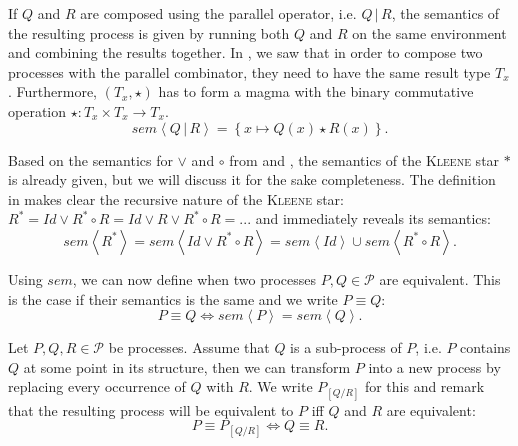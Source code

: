 If $Q$ and $R$ are composed using the parallel operator, i.e. $Q \,|\, R$, the semantics of the resulting process is given by running both $Q$ and $R$ on the same environment and combining the results together. In , we saw that in order to compose two processes with the parallel combinator, they need to have the same result type $T_x$. Furthermore, $\left( T_x, \star \right)$ has to form a magma with the binary commutative operation $\star \colon T_x \times T_x \to T_x$.
\begin{equation}
  \label{eqn:sem_parallel}
  sem \left\langle Q \,|\, R \right\rangle = \left\{ x \mapsto Q \left( x \right) \star R \left( x \right) \right\}.
\end{equation}

Based on the semantics for $\vee$ and $\circ$ from  and , the semantics of the \textsc{Kleene} star $*$ is already given, but we will discuss it for the sake completeness. The definition in  makes clear the recursive nature of the \textsc{Kleene} star: $R^* = Id \vee R^* \circ R = Id \vee R \vee R^* \circ R =  ...$ and immediately reveals its semantics:
\begin{equation}
  \label{eqn:sem_kleene}
  sem \left\langle R^* \right\rangle = sem \left\langle Id \vee R^* \circ R \right\rangle = sem \left\langle Id \right\rangle \cup sem \left\langle R^* \circ R \right\rangle.
\end{equation}

Using $sem$, we can now define when two processes $P, Q \in \mathcal{P}$ are equivalent. This is the case if their semantics is the same and we write $P \equiv Q$:
\begin{equation}
  \label{eqn:equivalence}
  P \equiv Q \Leftrightarrow sem \left\langle P \right\rangle = sem \left\langle Q \right\rangle.
\end{equation}

Let $P, Q, R \in \mathcal{P}$ be processes. Assume that $Q$ is a sub-process of $P$, i.e. $P$ contains $Q$ at some point in its structure, then we can transform $P$ into a new process by replacing every occurrence of $Q$ with $R$. We write $P_{\left[ Q / R \right]}$ for this and remark that the resulting process will be equivalent to $P$ iff $Q$ and $R$ are equivalent:
\begin{equation}
  P \equiv P_{\left[ Q / R \right]} \Leftrightarrow Q \equiv R.
\end{equation}

